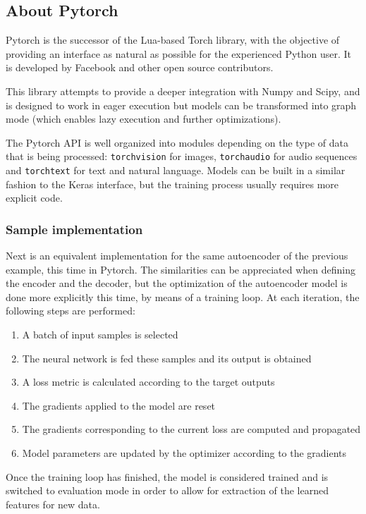 \subsection{About Pytorch}

Pytorch is the successor of the Lua-based Torch library, with the objective of providing an interface as natural as possible for the experienced Python user. It is developed by Facebook and other open source contributors.

This library attempts to provide a deeper integration with Numpy and Scipy, and is designed to work in eager execution but models can be transformed into graph mode (which enables lazy execution and further optimizations).

The Pytorch API is well organized into modules depending on the type of data that is being processed: \texttt{torchvision} for images, \texttt{torchaudio} for audio sequences and \texttt{torchtext} for text and natural language. Models can be built in a similar fashion to the Keras interface, but the training process usually requires more explicit code.

\subsubsection{Sample implementation}

Next is an equivalent implementation for the same autoencoder of the previous example, this time in Pytorch. The similarities can be appreciated when defining the encoder and the decoder, but the optimization of the autoencoder model is done more explicitly this time, by means of a training loop. At each iteration, the following steps are performed:

\begin{enumerate}
    \item A batch of input samples is selected
    \item The neural network is fed these samples and its output is obtained
    \item A loss metric is calculated according to the target outputs
    \item The gradients applied to the model are reset
    \item The gradients corresponding to the current loss are computed and propagated
    \item Model parameters are updated by the optimizer according to the gradients
\end{enumerate}

Once the training loop has finished, the model is considered trained and is switched to evaluation mode in order to allow for extraction of the learned features for new data.

